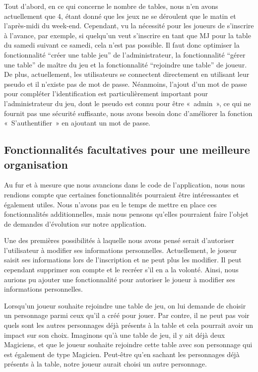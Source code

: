 \documentclass[11pt]{article}
\begin{document}
Tout d'abord, en ce qui concerne le nombre de tables, nous n'en avons actuellement que 4, étant donné que les jeux ne se déroulent que le matin et l'après-midi du week-end. Cependant, vu la nécessité pour les joueurs de s'inscrire à l'avance, par exemple, si quelqu'un veut s'inscrire en tant que MJ pour la table du samedi suivant ce samedi, cela n'est pas possible. Il faut donc optimiser la fonctionnalité “créer une table jeu” de l'administrateur, la fonctionnalité “gérer une table” de maître du jeu et la fonctionnalité “rejoindre une table” de joueur.\\

De plus, actuellement, les utilisateurs se connectent directement en utilisant leur pseudo et il n'existe pas de mot de passe. Néanmoins, l'ajout d'un mot de passe pour compléter l'identification est particulièrement important pour l'administrateur du jeu, dont le pseudo est connu pour être «~admin~», ce qui ne fournit pas une sécurité suffisante, nous avons besoin donc d'améliorer la fonction «~S'authentifier~» en ajoutant un mot de passe.






\subsection{Fonctionnalités facultatives pour une meilleure organisation}

Au fur et à mesure que nous avancions dans le code de l'application, nous nous rendions compte que certaines fonctionnalités pourraient être intéressantes et également utiles. Nous n'avons pas eu le temps de mettre en place ces fonctionnalités additionnelles, mais nous pensons qu'elles pourraient faire l'objet de demandes d'évolution sur notre application.

\bigbreak

Une des premières possibilités à laquelle nous avons pensé serait d'autoriser l'utilisateur à modifier ses informations personnelles. Actuellement, le joueur saisit ses informations lors de l'inscription et ne peut plus les modifier. Il peut cependant supprimer son compte et le recréer s'il en a la volonté. Ainsi, nous aurions pu ajouter une fonctionnalité pour autoriser le joueur à modifier ses informations personnelles.

\bigbreak

Lorsqu'un joueur souhaite rejoindre une table de jeu, on lui demande de choisir un personnage parmi ceux qu'il a créé pour jouer. Par contre, il ne peut pas voir quels sont les autres personnages déjà présents à la table et cela pourrait avoir un impact sur son choix. Imaginons qu'à une table de jeu, il y ait déjà deux Magiciens, et que le joueur souhaite rejoindre cette table avec son personnage qui est également de type Magicien. Peut-être qu'en sachant les personnages déjà présents à la table, notre joueur aurait choisi un autre personnage.
\end{document}
